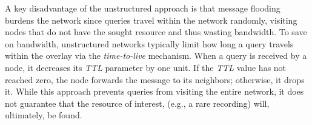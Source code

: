 A key disadvantage of the unstructured approach is that message flooding burdens
the network since queries travel within the network randomly, visiting nodes
that do not have the sought resource and thus wasting bandwidth.  
To save on bandwidth, unstructured networks typically limit how long 
a query travels within the overlay via the \emph{time-to-live} mechanism. 
When a query is received by a node, it decreases its \emph{TTL} parameter by one
unit. If the \emph{TTL} value has not reached zero, the node forwards the
message to its neighbors; otherwise, it drops it.
While this approach prevents queries from visiting the entire network, it
does not guarantee that the resource of interest, (e.g., a rare recording) 
will, ultimately, be found.
\begin{figure}[ht]
\centering
{}\qquad\qquad
{}
\end{figure}
